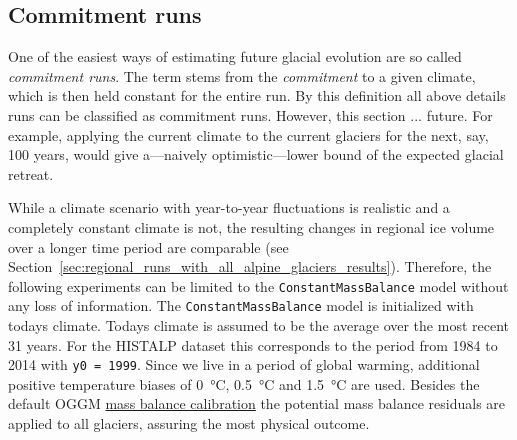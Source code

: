 
    \subsection{Commitment runs} %
    \label{sub:commitment_runs_setup}
        One of the easiest ways of estimating future glacial evolution are so called \textit{commitment runs}.
        The term stems from the \textit{commitment} to a given climate, which is then held constant for the entire run. By this definition all above details runs can be classified as commitment runs. However, this section ... future. %
        For example, applying the current climate to the current glaciers for the next, say, 100 years, would give a---naively optimistic---lower bound of the expected glacial retreat.

        While a climate scenario with year-to-year fluctuations is realistic and a completely constant climate is not, the resulting changes in regional ice volume over a longer time period are comparable (see Section~\ref{sec:regional_runs_with_all_alpine_glaciers_results}). Therefore, the following experiments can be limited to the \lstinline`ConstantMassBalance` model without any loss of information. The \lstinline`ConstantMassBalance` model is initialized with todays climate. Todays climate is assumed to be the average over the most recent 31 years. For the HISTALP dataset this corresponds to the period from 1984 to 2014 with \lstinline`y0 = 1999`. Since we live in a period of global warming, additional positive temperature biases of \SI{0}{\celsius}, \SI{+0.5}{\celsius} and \SI{+1.5}{\celsius} are used. Besides the default OGGM \hyperref[ssub:mb_calib]{mass balance calibration} the potential mass balance residuals \bias{} are applied to all glaciers, assuring the most physical outcome.
    

